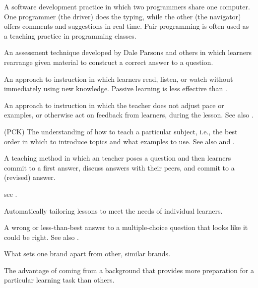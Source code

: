 \begin{description}
 A software development practice in
which two programmers share one computer. One programmer (the driver) does the
typing, while the other (the navigator) offers comments and suggestions in real
time. Pair programming is often used as a teaching practice in programming
classes.

 An assessment technique developed by
Dale Parsons and others in which learners rearrange given material to construct
a correct answer to a question.

 An approach to instruction in which
learners read, listen, or watch without immediately using new knowledge.
Passive learning is less effective than .

 An approach to instruction in which
the teacher does not adjust pace or examples, or otherwise act on feedback from
learners, during the lesson.  See also .

 (PCK)
The understanding of how to teach a particular subject, i.e., the best order in
which to introduce topics and what examples to use. See also
and .

 A teaching method in which an
teacher poses a question and then learners commit to a first answer, discuss
answers with their peers, and commit to a (revised) answer.

 see .

 Automatically tailoring
lessons to meet the needs of individual learners.

 A wrong or less-than-best
answer to a multiple-choice question that looks like it could be right. See also
.

 What sets one brand apart from other,
similar brands.

 The advantage of coming
from a background that provides more preparation for a particular learning task
than others.


\end{description}
